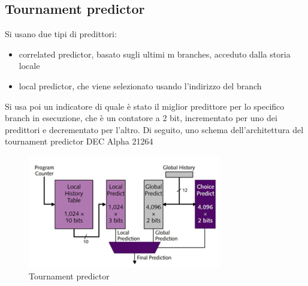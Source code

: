 \documentclass[12pt, oneside]{extbook} %
\begin{document}
\subsection{Tournament predictor}
Si usano due tipi di predittori:
\begin{itemize}
\item correlated predictor, basato sugli ultimi m branches, acceduto dalla storia locale
\item local predictor, che viene selezionato usando l'indirizzo del branch
\end{itemize}
Si usa poi un indicatore di quale è stato il miglior predittore per lo specifico branch in esecuzione, che è un contatore a 2 bit, incrementato per uno dei predittori e decrementato per l'altro. Di seguito, uno schema dell'architettura del tournament predictor DEC Alpha 21264\\
\begin{figure}
	\includegraphics[scale=1]{immagini/tourn_pred}
	\caption{Tournament predictor}
\end{figure}
\end{document}
